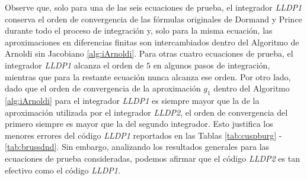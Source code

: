 Observe que, solo para una de las seis ecuaciones de prueba, el integrador \emph{LLDP1} conserva el orden de convergencia de las fórmulas originales de Dormand y Prince durante todo el proceso de integración y, solo para la misma ecuación, las aproximaciones en diferencias finitas son intercambiados dentro del Algoritmo de Arnoldi sin Jacobiano \ref{alg:iArnoldi}. Para otras cuatro ecuaciones de prueba, el integrador \emph{LLDP1} alcanza el orden de $5$ en algunos pasos de integración, mientras que para la restante ecuación nunca alcanza ese orden. Por otro lado, dado que el orden de convergencia de la aproximación $g_1$ dentro del Algoritmo \ref{alg:iArnoldi} para el integrador \emph{LLDP1} es siempre mayor que la de la aproximación utilizada por el integrador \emph{LLDP2}, el orden de convergencia del primero siempre es mayor que la del segundo integrador. Esto justifica los menores errores del código \emph{LLDP1} reportados en las Tablas \ref{tab:cuspburg} - \ref{tab:brussdnd}. Sin embargo, analizando los resultados generales para las ecuaciones de prueba consideradas, podemos afirmar que el código \emph{LLDP2} es tan efectivo como el código \emph{LLDP1}.


